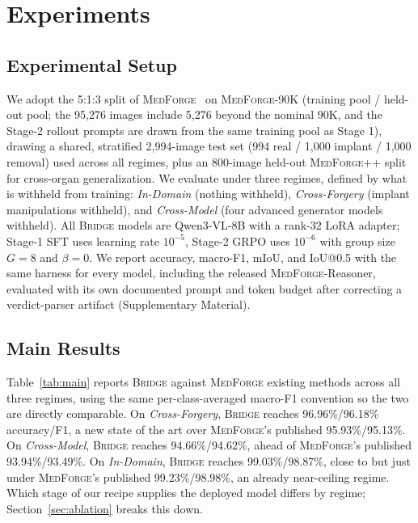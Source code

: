 \documentclass[10pt,twocolumn,letterpaper]{article}
\newcommand{\bridge}{\textsc{Bridge}}
\newcommand{\medforge}{\textsc{MedForge}}
\newcommand{\medforgepp}{\textsc{MedForge++}}
\begin{document}
\section{Experiments}
\label{sec:exp}

\subsection{Experimental Setup}
\label{sec:setup}
We adopt the 5:1:3 split of \medforge{}~\cite{medforge2026} on \medforge{}-90K (training pool / held-out pool; the 95{,}276 images include 5{,}276 beyond the nominal 90K, and the Stage-2 rollout prompts are drawn from the same training pool as Stage 1), drawing a shared, stratified 2{,}994-image test set (994 real / 1{,}000 implant / 1{,}000 removal) used across all regimes, plus an 800-image held-out \medforgepp{} split for cross-organ generalization. We evaluate under three regimes, defined by what is withheld from training: \emph{In-Domain} (nothing withheld), \emph{Cross-Forgery} (implant manipulations withheld), and \emph{Cross-Model} (four advanced generator models withheld). All \bridge{} models are Qwen3-VL-8B with a rank-32 LoRA adapter; Stage-1 SFT uses learning rate $10^{-5}$, Stage-2 GRPO uses $10^{-6}$ with group size $G{=}8$ and $\beta{=}0$. We report accuracy, macro-F1, mIoU, and IoU@0.5 with the same harness for every model, including the released \medforge{}-Reasoner, evaluated with its own documented prompt and token budget after correcting a verdict-parser artifact (Supplementary Material).

\subsection{Main Results}
\label{sec:main}
Table~\ref{tab:main} reports \bridge{} against \medforge{} existing methods across all three regimes, using the same per-class-averaged macro-F1 convention so the two are directly comparable. On \emph{Cross-Forgery}, \bridge{} reaches 96.96\%/96.18\% accuracy/F1, a new state of the art over \medforge{}'s published 95.93\%/95.13\%. On \emph{Cross-Model}, \bridge{} reaches 94.66\%/94.62\%, ahead of \medforge{}'s published 93.94\%/93.49\%. On \emph{In-Domain}, \bridge{} reaches 99.03\%/98.87\%, close to but just under \medforge{}'s published 99.23\%/98.98\%, an already near-ceiling regime. Which stage of our recipe supplies the deployed model differs by regime; Section~\ref{sec:ablation} breaks this down.
\end{document}
